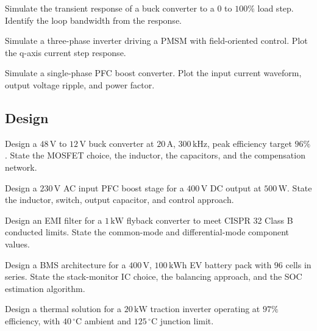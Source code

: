 \begin{exercise}
Simulate the transient response of a buck converter to a $0$ to $100\%$ load step. Identify the loop bandwidth from the response.
\end{exercise}

\begin{exercise}
Simulate a three-phase inverter driving a PMSM with field-oriented control. Plot the q-axis current step response.
\end{exercise}

\begin{exercise}
Simulate a single-phase PFC boost converter. Plot the input current waveform, output voltage ripple, and power factor.
\end{exercise}

\subsection*{Design}

\begin{exercise}
Design a $48\,\text{V}$ to $12\,\text{V}$ buck converter at $20\,\text{A}$, $300\,\text{kHz}$, peak efficiency target $96\%$. State the MOSFET choice, the inductor, the capacitors, and the compensation network.
\end{exercise}

\begin{exercise}
Design a $230\,\text{V}$ AC input PFC boost stage for a $400\,\text{V}$ DC output at $500\,\text{W}$. State the inductor, switch, output capacitor, and control approach.
\end{exercise}

\begin{exercise}
Design an EMI filter for a $1\,\text{kW}$ flyback converter to meet CISPR 32 Class B conducted limits. State the common-mode and differential-mode component values.
\end{exercise}

\begin{exercise}
Design a BMS architecture for a $400\,\text{V}$, $100\,\text{kWh}$ EV battery pack with $96$ cells in series. State the stack-monitor IC choice, the balancing approach, and the SOC estimation algorithm.
\end{exercise}

\begin{exercise}
Design a thermal solution for a $20\,\text{kW}$ traction inverter operating at $97\%$ efficiency, with $40\,^\circ\text{C}$ ambient and $125\,^\circ\text{C}$ junction limit.
\end{exercise}

